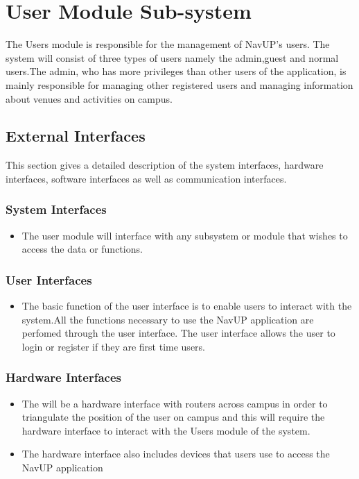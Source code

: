 

\section{User Module Sub-system}

The Users module is responsible for the management of NavUP's users. The system will consist of three types of users namely the admin,guest and normal users.The admin, who has more privileges than other users of the application, is mainly responsible for managing other registered users and managing information about venues and activities on campus.

\subsection{External Interfaces}
This section gives a detailed description of the system interfaces, hardware interfaces, software interfaces as well as communication interfaces.

	\subsubsection{System Interfaces}
		\begin{itemize}
			\item The user module will interface with any subsystem or module that wishes to access the data or               functions. 
		
		\end{itemize}
	\subsubsection{User Interfaces }
	\begin{itemize}

	\item The basic function of the user interface is to enable users to interact with the system.All the functions necessary to use the NavUP application are perfomed through the user interface. The user interface allows the user to login or register if they are first time users. 
 \end{itemize}
 
	\subsubsection{Hardware Interfaces }
	\begin{itemize}
	\item The will be a hardware interface with routers across campus in order to triangulate the position of the user on campus and this will require the hardware interface to interact with the Users module of the system. 
	\item The hardware interface also includes devices that users use to access the NavUP application 
	\end{itemize}

